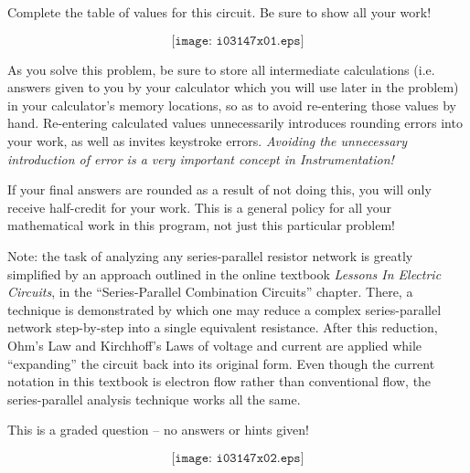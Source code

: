 

Complete the table of values for this circuit.  Be sure to show all your work!

$$\texttt{[image: i03147x01.eps]}$$

As you solve this problem, be sure to store all intermediate calculations (i.e. answers given to you by your calculator which you will use later in the problem) in your calculator's memory locations, so as to avoid re-entering those values by hand.  Re-entering calculated values unnecessarily introduces rounding errors into your work, as well as invites keystroke errors.  {\it Avoiding the unnecessary introduction of error is a very important concept in Instrumentation!}

If your final answers are rounded as a result of not doing this, you will only receive half-credit for your work.  This is a general policy for all your mathematical work in this program, not just this particular problem!

\vfil 

Note: the task of analyzing any series-parallel resistor network is greatly simplified by an approach outlined in the online textbook {\it Lessons In Electric Circuits}, in the ``Series-Parallel Combination Circuits'' chapter.  There, a technique is demonstrated by which one may reduce a complex series-parallel network step-by-step into a single equivalent resistance.  After this reduction, Ohm's Law and Kirchhoff's Laws of voltage and current are applied while ``expanding'' the circuit back into its original form.  Even though the current notation in this textbook is electron flow rather than conventional flow, the series-parallel analysis technique works all the same.

\eject






This is a graded question -- no answers or hints given!







$$\texttt{[image: i03147x02.eps]}$$



